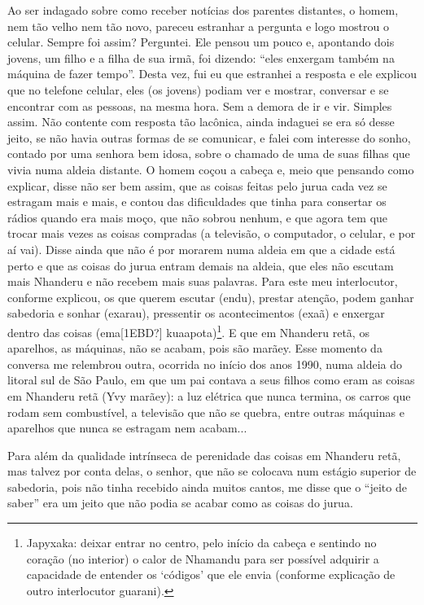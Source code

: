 \documentclass{article}
\begin{document}
Ao ser indagado sobre como receber not\'icias dos parentes distantes, o
homem, nem t\~ao velho nem t\~ao novo, pareceu estranhar a pergunta e
logo mostrou o celular. Sempre foi assim? Perguntei. Ele pensou um
pouco e, apontando dois jovens, um filho e a filha de sua irm\~a, foi
dizendo: {\textquotedblleft}eles enxergam tamb\'em na m\'aquina de
fazer tempo{\textquotedblright}. Desta vez, fui eu que estranhei a
resposta e ele explicou que no telefone celular, eles (os jovens)
podiam ver e mostrar, conversar e se encontrar com as pessoas, na mesma
hora. Sem a demora de ir e vir. Simples assim. N\~ao contente com
resposta t\~ao lac\^onica, ainda indaguei se era s\'o desse jeito, se
n\~ao havia outras formas de se comunicar, e falei com interesse do
sonho, contado por uma senhora bem idosa, sobre o chamado de uma de
suas filhas que vivia numa aldeia distante. O homem co\c{c}ou a
cabe\c{c}a e, meio que pensando como explicar, disse n\~ao ser bem
assim, que as coisas feitas pelo jurua cada vez se estragam mais e
mais, e contou das dificuldades que tinha para consertar os r\'adios
quando era mais mo\c{c}o, que n\~ao sobrou nenhum, e que agora tem que
trocar mais vezes as coisas compradas (a televis\~ao, o computador, o
celular, e por a\'i vai). Disse ainda que n\~ao \'e por morarem numa
aldeia em que a cidade est\'a perto e que as coisas do jurua entram
demais na aldeia, que eles n\~ao escutam mais Nhanderu e n\~ao recebem
mais suas palavras. Para este meu interlocutor, conforme explicou, os
que querem escutar (endu), prestar aten\c{c}\~ao, podem ganhar
sabedoria e sonhar (exarau), pressentir os acontecimentos (exa\~a) e
enxergar dentro das coisas (ema[1EBD?] kuaapota)\footnote{ Japyxaka:
deixar entrar no centro, pelo in\'icio da cabe\c{c}a e sentindo no
cora\c{c}\~ao (no interior) o calor de Nhamandu para ser poss\'ivel
adquirir a capacidade de entender os
{\textquoteleft}c\'odigos{\textquoteright} que ele envia (conforme
explica\c{c}\~ao de outro interlocutor guarani).}. E que em Nhanderu
ret\~a, os aparelhos, as m\'aquinas, n\~ao se acabam, pois s\~ao
mar\~aey. Esse momento da conversa me relembrou outra, ocorrida no
in\'icio dos anos 1990, numa aldeia do litoral sul de S\~ao Paulo, em
que um pai contava a seus filhos como eram as coisas em Nhanderu ret\~a
(Yvy mar\~aey): a luz el\'etrica que nunca termina, os carros que rodam
sem combust\'ivel, a televis\~ao que n\~ao se quebra, entre outras
m\'aquinas e aparelhos que nunca se estragam nem acabam... 

Para al\'em da qualidade intr\'inseca de perenidade das coisas em
Nhanderu ret\~a, mas talvez por conta delas, o senhor, que n\~ao se
colocava num est\'agio superior de sabedoria, pois n\~ao tinha recebido
ainda muitos cantos, me disse que o {\textquotedblleft}jeito de
saber{\textquotedblright} era um jeito que n\~ao podia se acabar como
as coisas do jurua.
\end{document}
